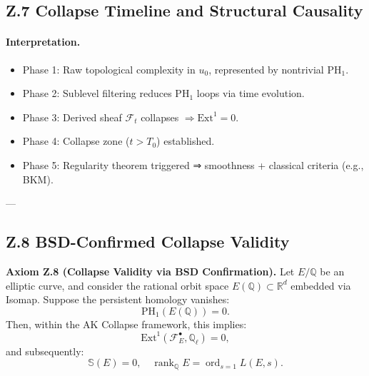 \documentclass[11pt]{article}
\newcommand{\Sha}{\mathbb{S}}
\begin{document}
\begin{axiom}
\begin{axiom}
{{\subsection*{Z.7 Collapse Timeline and Structural Causality}

\begin{center}
\end{center}

\vspace{1em}

\paragraph{Interpretation.}
\begin{itemize}
  \item Phase 1: Raw topological complexity in $u_0$, represented by nontrivial $\mathrm{PH}_1$.
  \item Phase 2: Sublevel filtering reduces $\mathrm{PH}_1$ loops via time evolution.
  \item Phase 3: Derived sheaf $\mathcal{F}_t$ collapses $\Rightarrow \mathrm{Ext}^1 = 0$.
  \item Phase 4: Collapse zone ($t > T_0$) established.
  \item Phase 5: Regularity theorem triggered ⇒ smoothness + classical criteria (e.g., BKM).
\end{itemize}

---

\subsection*{Z.8 BSD-Confirmed Collapse Validity}

\textbf{Axiom Z.8 (Collapse Validity via BSD Confirmation).}  
Let \( E/\mathbb{Q} \) be an elliptic curve, and consider the rational orbit space \( E(\mathbb{Q}) \subset \mathbb{R}^d \) embedded via Isomap.  
Suppose the persistent homology vanishes:
\[
\mathrm{PH}_1(E(\mathbb{Q})) = 0.
\]
Then, within the AK Collapse framework, this implies:
\[
\mathrm{Ext}^1(\mathcal{F}_E^\bullet, \mathbb{Q}_\ell) = 0,
\]
and subsequently:
\[
\Sha(E) = 0, \quad \operatorname{rank}_\mathbb{Q} E = \operatorname{ord}_{s=1}L(E, s).
\]

}}
\end{axiom}
\end{axiom}
\end{document}
